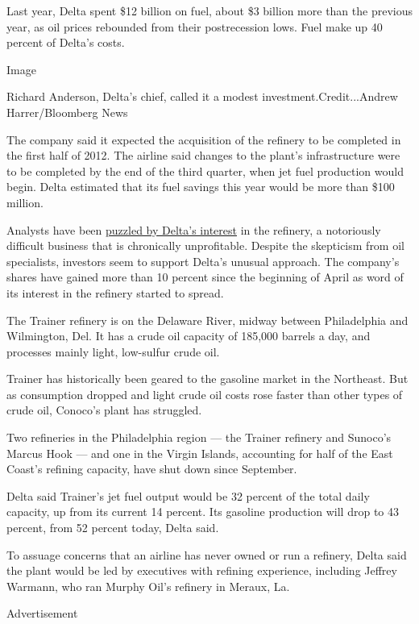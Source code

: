 Last year, Delta spent \$12 billion on fuel, about \$3 billion more than
the previous year, as oil prices rebounded from their postrecession
lows. Fuel make up 40 percent of Delta's costs.

Image

Richard Anderson, Delta's chief, called it a modest
investment.Credit...Andrew Harrer/Bloomberg News

The company said it expected the acquisition of the refinery to be
completed in the first half of 2012. The airline said changes to the
plant's infrastructure were to be completed by the end of the third
quarter, when jet fuel production would begin. Delta estimated that its
fuel savings this year would be more than \$100 million.

Analysts have been
\href{http://www.nytimes3xbfgragh.onion/2012/04/05/business/deltas-puzzling-interest-in-buying-an-oil-refinery.html}{puzzled
by Delta's interest} in the refinery, a notoriously difficult business
that is chronically unprofitable. Despite the skepticism from oil
specialists, investors seem to support Delta's unusual approach. The
company's shares have gained more than 10 percent since the beginning of
April as word of its interest in the refinery started to spread.

The Trainer refinery is on the Delaware River, midway between
Philadelphia and Wilmington, Del. It has a crude oil capacity of 185,000
barrels a day, and processes mainly light, low-sulfur crude oil.

Trainer has historically been geared to the gasoline market in the
Northeast. But as consumption dropped and light crude oil costs rose
faster than other types of crude oil, Conoco's plant has struggled.

Two refineries in the Philadelphia region --- the Trainer refinery and
Sunoco's Marcus Hook --- and one in the Virgin Islands, accounting for
half of the East Coast's refining capacity, have shut down since
September.

Delta said Trainer's jet fuel output would be 32 percent of the total
daily capacity, up from its current 14 percent. Its gasoline production
will drop to 43 percent, from 52 percent today, Delta said.

To assuage concerns that an airline has never owned or run a refinery,
Delta said the plant would be led by executives with refining
experience, including Jeffrey Warmann, who ran Murphy Oil's refinery in
Meraux, La.

Advertisement

